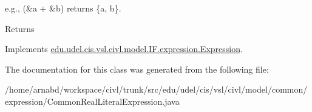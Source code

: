 e.\+g., {\ttfamily (\&a + \&b)} returns {\ttfamily \{a, b\}}.

\begin{DoxyReturn}{Returns}

\end{DoxyReturn}


Implements \hyperlink{interfaceedu_1_1udel_1_1cis_1_1vsl_1_1civl_1_1model_1_1IF_1_1expression_1_1Expression_ac2ad0236534bec54b91ee78ff658cbe0}{edu.\+udel.\+cis.\+vsl.\+civl.\+model.\+I\+F.\+expression.\+Expression}.



The documentation for this class was generated from the following file\+:\begin{DoxyCompactItemize}
\item 
/home/arnabd/workspace/civl/trunk/src/edu/udel/cis/vsl/civl/model/common/expression/Common\+Real\+Literal\+Expression.\+java\end{DoxyCompactItemize}
